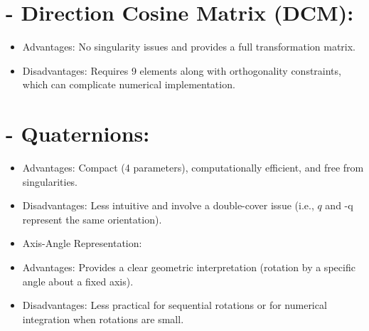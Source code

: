 \documentclass[10pt]{article}
\begin{document}
\section*{- Direction Cosine Matrix (DCM):}
\begin{itemize}
  \item Advantages: No singularity issues and provides a full transformation matrix.
  \item Disadvantages: Requires 9 elements along with orthogonality constraints, which can complicate numerical implementation.
\end{itemize}

\section*{- Quaternions:}
\begin{itemize}
  \item Advantages: Compact (4 parameters), computationally efficient, and free from singularities.
  \item Disadvantages: Less intuitive and involve a double-cover issue (i.e., $q$ and -q represent the same orientation).
  \item Axis-Angle Representation:
  \item Advantages: Provides a clear geometric interpretation (rotation by a specific angle about a fixed axis).
  \item Disadvantages: Less practical for sequential rotations or for numerical integration when rotations are small.
\end{itemize}
\end{document}
